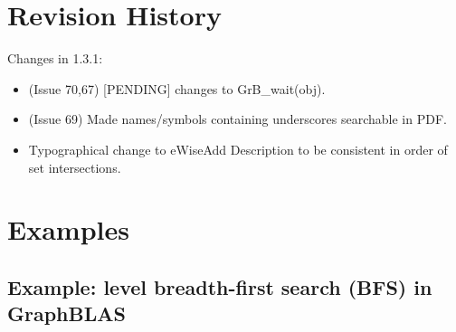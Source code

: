 %

\chapter{Revision History}
\label{Chp:RevHistory}

Changes in 1.3.1:
\begin{itemize}
\item (Issue 70,67) [PENDING] changes to {\sf GrB\_wait(obj)}.
\item (Issue 69) Made names/symbols containing underscores searchable in PDF.
\item Typographical change to eWiseAdd Description to be consistent in order of set intersections.
\end{itemize}


\chapter{Examples}
\label{Chp:Examples}

\pagebreak
\nolinenumbers
\section{Example: level breadth-first search (BFS) in GraphBLAS}
{\scriptsize

}
\vfill

%
%
%

\pagebreak
